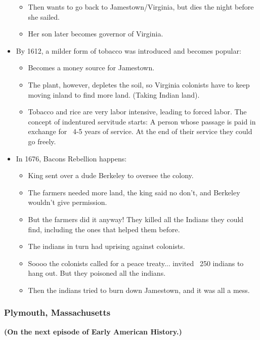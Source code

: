 \documentclass{article}
\begin{document}
\begin{itemize}
\begin{itemize}
              \item Then wants to go back to Jamestown/Virginia, but dies the night before she sailed.
              \item Her son later becomes governor of Virginia.
            \end{itemize}
          \item By 1612, a milder form of tobacco was introduced and becomes popular:
            \begin{itemize}
              \item Becomes a money source for Jamestown.
              \item The plant, however, depletes the soil, so Virginia colonists have to keep moving inland to find more land. (Taking Indian land).
              \item Tobacco and rice are very labor intensive, leading to forced labor. The concept of indentured servitude starts: A person whose passage is paid in exchange for ~4-5 years of service. At the end of their service they could go freely. 
            \end{itemize}
          \item In 1676, Bacons Rebellion happens:
            \begin{itemize}
              \item King sent over a dude Berkeley to oversee the colony.
              \item The farmers needed more land, the king said no don't, and Berkeley wouldn't give permission.
              \item But the farmers did it anyway! They killed all the Indians they could find, including the ones that helped them before.
              \item The indians in turn had uprising against colonists.
              \item Soooo the colonists called for a peace treaty... invited ~250 indians to hang out. But they poisoned all the indians.
              \item Then the indians tried to burn down Jamestown, and it was all a mess.
            \end{itemize}
        \end{itemize}

      \subsubsection{Plymouth, Massachusetts}
        \textbf{(On the next episode of Early American History.)}
\end{document}
